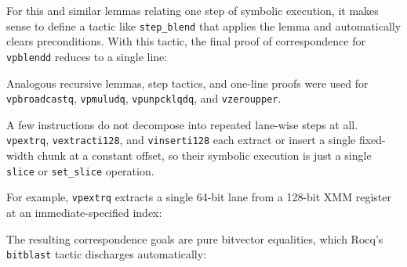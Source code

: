 
For this and similar lemmas relating one step of symbolic execution, it makes sense to define a tactic like \texttt{step_blend} that applies the lemma and automatically clears preconditions. With this tactic, the final proof of correspondence for \texttt{vpblendd} reduces to a single line:


Analogous recursive lemmas, step tactics, and one-line proofs were used for \texttt{vpbroadcastq}, \texttt{vpmuludq}, \texttt{vpunpcklqdq}, and \texttt{vzeroupper}.

A few instructions do not decompose into repeated lane-wise steps at all. \texttt{vpextrq}, \texttt{vextracti128}, and \texttt{vinserti128} each extract or insert a single fixed-width chunk at a constant offset, so their symbolic execution is just a single \texttt{slice} or \texttt{set_slice} operation.

For example, \texttt{vpextrq} extracts a single 64-bit lane from a 128-bit XMM register at an immediate-specified index:


The resulting correspondence goals are pure bitvector equalities, which Rocq's \texttt{bitblast} tactic discharges automatically:



